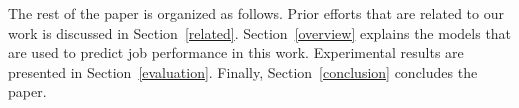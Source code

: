 \noindent
The rest of the paper is organized as follows. Prior efforts that are related to our work is discussed in Section~\ref{related}. Section~\ref{overview} explains the models that are used to predict job performance in this work. Experimental results are presented in Section~\ref{evaluation}. Finally, Section~\ref{conclusion} concludes the paper.

